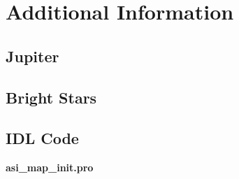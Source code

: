 \documentclass[11pt,twoside]{article}   %
\begin{document}


\newpage
\section{Additional Information}

 \subsection{Jupiter}

 \tiny
 
 \normalsize

 \subsection{Bright Stars}

 \begin{table}[htb!]
   \begin{center}
    \fontsize{8}{8} \selectfont
   
   \normalsize
   \end{center}
 \caption{Sources from the Yale Bright Star Catalog with visual magnitudes
          less than 2.5, sorted by declination.  Particularly bright sources
          are marked with gray shading.  Sources with declinations less than
          $-20^\circ$ are not included.}
 \end{table}
\newpage


  \begin{landscape}
 \subsection{IDL Code} \label{sec:idl_code}
   \fontsize{6}{5} \selectfont
  \setlength{\columnseprule}{0.4pt}
  \begin{multicols}{2}
  {\large \bf asi\_map\_init.pro}
   
  \end{multicols}
  \normalsize
  \end{landscape}


\newpage

\end{document}
